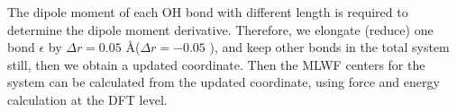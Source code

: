 %        
%
The dipole moment of each OH bond with different length is required to determine the dipole moment derivative. 
Therefore, we elongate (reduce) one bond ${\epsilon}$ by $\Delta r = 0.05$ \AA ($\Delta r = -0.05 $ \A), and keep other 
bonds in the total system still, then we obtain a updated coordinate.
Then the MLWF centers for the system can be calculated from the updated coordinate, using force and energy calculation at the DFT level.
